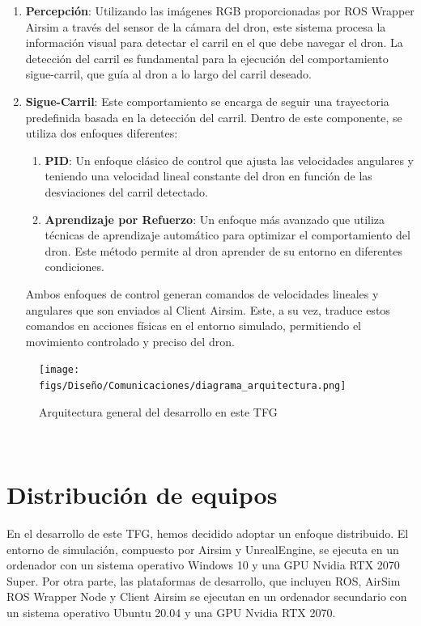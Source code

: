 \begin{enumerate}
  \item \textbf{Percepción}: Utilizando las imágenes RGB proporcionadas por ROS Wrapper Airsim a través del sensor de la cámara del dron, este sistema procesa la información
  visual para detectar el carril en el que debe navegar el dron. La detección del carril es fundamental para la ejecución del comportamiento sigue-carril, que guía al dron 
  a lo largo del carril deseado. 
  \item \textbf{Sigue-Carril}: Este comportamiento se encarga de seguir una trayectoria predefinida basada en la detección del carril. Dentro de este componente, se 
  utiliza dos enfoques diferentes: 
  \begin{enumerate}
    \item \textbf{PID}: Un enfoque clásico de control que ajusta las velocidades angulares y teniendo una velocidad lineal constante del dron en función de las desviaciones
    del carril detectado.
    \item \textbf{Aprendizaje por Refuerzo}: Un enfoque más avanzado que utiliza técnicas de aprendizaje automático para optimizar el comportamiento del dron. Este método 
    permite al dron aprender de su entorno en diferentes condiciones. 
  \end{enumerate}

  Ambos enfoques de control generan comandos de velocidades lineales y angulares que son enviados al Client Airsim. Este, a su vez, traduce estos comandos en acciones físicas 
  en el entorno simulado, permitiendo el movimiento controlado y preciso del dron. 
\end{enumerate}

\begin{figure} [H]
    \begin{center}
      \texttt{[image: figs/Diseño/Comunicaciones/diagrama\_arquitectura.png]}
    \end{center}
    \caption{Arquitectura general del desarrollo en este TFG}
    \label{fig:infraestructura}
  \end{figure}\

\section{Distribución de equipos}
\label{distribución}
En el desarrollo de este TFG, hemos decidido adoptar un enfoque distribuido. El entorno de simulación, compuesto por Airsim y UnrealEngine, se ejecuta en un ordenador con un sistema 
operativo Windows 10 y una GPU Nvidia RTX 2070 Super. Por otra parte, las plataformas de desarrollo, que incluyen ROS, AirSim ROS Wrapper Node y Client Airsim se ejecutan en un ordenador secundario 
con un sistema operativo Ubuntu 20.04 y una GPU Nvidia RTX 2070.

